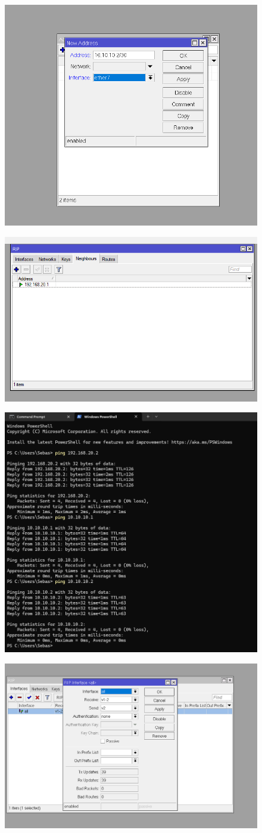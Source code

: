 \begin{figure}[H]
    \centering
    \includegraphics[width=0.5\linewidth]{P1/img/Address Router Router 2.png}
    
    \label{fig:enter-label}
\end{figure}
\begin{figure}[H]
    \centering
    \includegraphics[width=0.5\linewidth]{P1/img/rip neighbours.png}
    
    \label{fig:enter-label}
\end{figure}
\begin{figure}[H]
    \centering
    \includegraphics[width=0.5\linewidth]{P1/img/static.png}
    
    \label{fig:enter-label}
\end{figure}
\begin{figure}[H]
    \centering
    \includegraphics[width=0.5\linewidth]{P1/img/rip interfaces 2.png}
    \label{fig:enter-label}
\end{figure}
